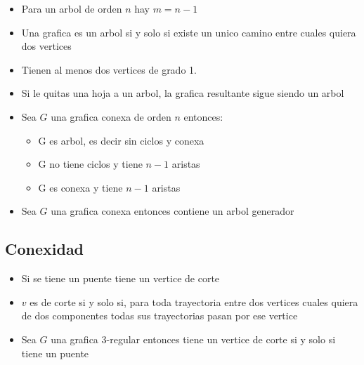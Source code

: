 \documentclass[12pt, fleqn]{report}                             %
\theoremstyle{break}                                            %
\begin{document}
                \begin{itemize}
                    \item Para un arbol de orden $n$ hay $m = n - 1$
                    \item Una grafica es un arbol si y solo si existe un unico camino entre cuales quiera dos vertices
                    \item Tienen al menos dos vertices de grado 1.
                    \item Si le quitas una hoja a un arbol, la grafica resultante sigue siendo un arbol
                    \item Sea $G$ una grafica conexa de orden $n$ entonces:
                    \begin{itemize}
                        \item G es arbol, es decir sin ciclos y conexa
                        \item G no tiene ciclos y tiene $n - 1$ aristas
                        \item G es conexa y tiene $n - 1$ aristas
                    \end{itemize}

                    \item Sea $G$ una grafica conexa entonces contiene un arbol generador
            \end{itemize}
                


            \subsection{Conexidad}

                \begin{itemize}
                    \item Si se tiene un puente tiene un vertice de corte
                    \item $v$ es de corte si y solo si, para toda trayectoria entre dos vertices cuales quiera
                    de dos componentes todas sus trayectorias pasan por ese vertice
                    \item Sea $G$ una grafica 3-regular entonces tiene un vertice de corte si y solo si 
                    tiene un puente
                \end{itemize}
\end{document}
